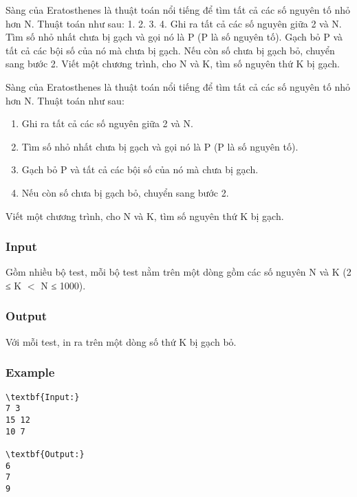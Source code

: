

Sàng của Eratosthenes là thuật toán nổi tiếng để tìm tất cả các số nguyên tố nhỏ hơn N. Thuật toán như sau: 1. 2. 3. 4. Ghi ra tất cả các số nguyên giữa 2 và N. Tìm số nhỏ nhất chưa bị gạch và gọi nó là P (P là số nguyên tố). Gạch bỏ P và tất cả các bội số của nó mà chưa bị gạch. Nếu còn số chưa bị gạch bỏ, chuyển sang bước 2. Viết một chương trình, cho N và K, tìm số nguyên thứ K bị gạch.

Sàng của Eratosthenes là thuật toán nổi tiếng để tìm tất cả các số nguyên tố nhỏ hơn N. Thuật toán như sau:
\begin{enumerate}
	\item Ghi ra tất cả các số nguyên giữa 2 và N.
	\item Tìm số nhỏ nhất chưa bị gạch và gọi nó là P (P là số nguyên tố).
	\item Gạch bỏ P và tất cả các bội số của nó mà chưa bị gạch.
	\item Nếu còn số chưa bị gạch bỏ, chuyển sang bước 2.
\end{enumerate}

Viết một chương trình, cho N và K, tìm số nguyên thứ K bị gạch.

\subsubsection{Input}

Gồm nhiều bộ test, mỗi bộ test nằm trên một dòng gồm các số nguyên N và K (2 ≤ K $<$ N ≤ 1000).

\subsubsection{Output}

Với mỗi test, in ra trên một dòng số thứ K bị gạch bỏ.

\subsubsection{Example}
\begin{verbatim}
\textbf{Input:}
7 3
15 12
10 7

\textbf{Output:}
6
7
9\end{verbatim}